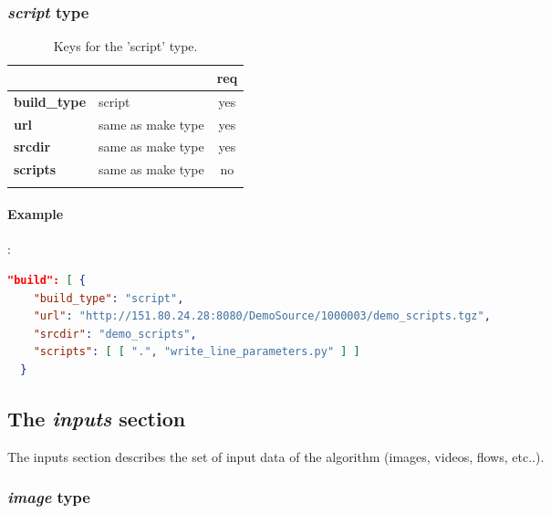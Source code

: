 \subsubsection{\emph{script} type}

\begin{longtable}{|>{\bf}L{\linewidth}|L{\linewidth}|c|}
\hline
{}     &  & {\bf req} \tabularnewline 
\hline \hline
 build\_type  & script & yes \\ \hline
 url          & same as make type & yes \\ \hline
 srcdir       & same as make type & yes \\ \hline
 scripts      & same as make type & no  \\ \hline
\caption{Keys for the 'script' type.}
\end{longtable}

\paragraph{Example}:\\
\begin{lstlisting}[language=json,firstnumber=1]
"build": [ { 
    "build_type": "script",
    "url": "http://151.80.24.28:8080/DemoSource/1000003/demo_scripts.tgz",
    "srcdir": "demo_scripts",
    "scripts": [ [ ".", "write_line_parameters.py" ] ]
  }
\end{lstlisting}


\subsection{The \emph{inputs} section}
The inputs section describes the set of input data of the algorithm (images, 
videos, flows, etc..).

\subsubsection{\emph{image} type}

